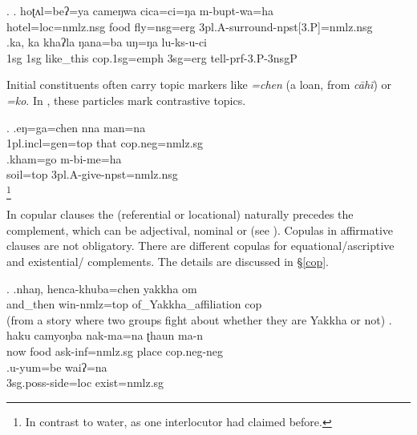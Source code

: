 \ex. \ag.   hoʈʌl=beʔ=ya          cameŋwa  cica=ci=ŋa      m-bupt-wa=ha\\
hotel{\sc =loc=nmlz.nsg} food fly{\sc =nsg=erg} {\sc 3pl.A-}surround{\sc -npst[3.P]=nmlz.nsg}\\
 
\bg.ka,  ka  khaʔla   ŋana=ba                uŋ=ŋa   lu-ks-u-ci\\
{\sc 1sg} {\sc 1sg} like\_this {\sc cop.1sg=emph} {\sc 3sg=erg} tell{\sc -prf-3.P-3nsgP}\\
 
 
 Initial constituents often carry topic markers  like \emph{=chen} (a  loan, from  \emph{cāhĩ}) or \emph{=ko}. In \Next, these particles mark  contrastive topics.
 
 \ex. \ag.eŋ=ga=chen                nna  man=na\\
 {\sc 1pl.incl=gen=top} that  {\sc cop.neg=nmlz.sg}\\
   
 \bg.kham=go     m-bi-me=ha\\
 soil{\sc =top} {\sc 3pl.A-}give{\sc -npst=nmlz.nsg}\\
 \footnote{In contrast to water, as one interlocutor had claimed before.}
 
 In copular clauses the (referential or locational) naturally precedes the complement, which can be adjectival, nominal or  (see \Next). Copulas in affirmative clauses are not obligatory. There are different copulas for equational/ascriptive  and existential/ complements. The details are discussed in §\ref{cop}. 
 
 \ex. \ag.nhaŋ,    henca-khuba=chen  yakkha          om\\
 and\_then win{\sc -nmlz=top} of\_Yakkha\_affiliation {\sc cop}\\
  (from a story where two groups fight about whether they are Yakkha or not) 
   	\bg.  haku        camyoŋba  nak-ma=na               ʈhaun ma-n\\
		now food ask{\sc -inf=nmlz.sg} place {\sc cop.neg-neg}\\
	 
	\bg.u-yum=be waiʔ=na\\
	{\sc 3sg.poss-}side{\sc =loc} exist{\sc [3]=nmlz.sg}\\
	
